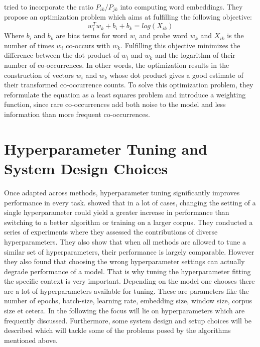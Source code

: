 \documentclass[]{krantz}
\begin{document}
\citet{Pennington.2014} tried to incorporate the ratio \(P_{ik}/P_{jk}\) into computing word embeddings. They propose an optimization problem which aims at fulfilling the following objective:
\[w_i^Tw_k + b_i + b_k = log(X_{ik})\]
Where \(b_i\) and \(b_k\) are bias terms for word \(w_i\) and probe word \(w_k\) and \(X_{ik}\) is the number of times \(w_i\) co-occurs with \(w_k\). Fulfilling this objective minimizes the difference between the dot product of \(w_i\) and \(w_k\) and the logarithm of their number of co-occurrences. In other words, the optimization results in the construction of vectors \(w_i\) and \(w_k\) whose dot product gives a good estimate of their transformed co-occurrence counts. To solve this optimization problem, they reformulate the equation as a least squares problem and introduce a weighting function, since rare co-occurrences add both noise to the model and less information than more frequent co-occurrences.

\hypertarget{hyperparameter-tuning-and-system-design-choices}{%
\section{Hyperparameter Tuning and System Design Choices}\label{hyperparameter-tuning-and-system-design-choices}}

Once adapted across methods, hyperparameter tuning significantly improves performance in every task. \citet{levy2015improving} showed that in a lot of cases, changing the setting of a single hyperparameter could yield a greater increase in performance than switching to a better algorithm or training on a larger corpus. They conducted a series of experiments where they assessed the contributions of diverse hyperparameters. They also show that when all methods are allowed to tune a similar set of hyperparameters, their performance is largely comparable. However they also found that choosing the wrong hyperparameter settings can actually degrade performance of a model. That is why tuning the hyperparameter fitting the specific context is very important. Depending on the model one chooses there are a lot of hyperparameters available for tuning. These are parameters like the number of epochs, batch-size, learning rate, embedding size, window size, corpus size et cetera. In the following the focus will lie on hyperparameters which are frequently discussed. Furthermore, some system design and setup choices will be described which will tackle some of the problems posed by the algorithms mentioned above.
\end{document}
